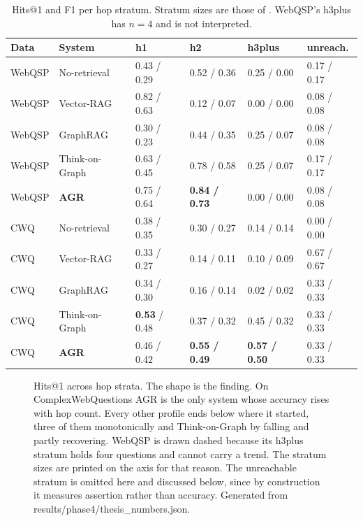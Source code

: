 \begin{table}[!tb]
  \begin{center}
    \caption[Hits@1 and F1 per hop stratum]{Hits@1 and F1 per hop stratum.
    Stratum sizes are those of . WebQSP's \textsf{h3plus} has
    $n = 4$ and is not interpreted.}
    \label{tab:strata}
    \small
    \begin{tabular}{|l|l|l|l|l|l|}
      \hline
      \textbf{Data} & \textbf{System} & \textbf{h1} & \textbf{h2} &
      \textbf{h3plus} & \textbf{unreach.} \\
      \hline
      WebQSP & No-retrieval   & 0.43 / 0.29 & 0.52 / 0.36 & 0.25 / 0.00 & 0.17 /
        0.17 \\
      WebQSP & Vector-RAG     & 0.82 / 0.63 & 0.12 / 0.07 & 0.00 / 0.00 & 0.08 /
        0.08 \\
      WebQSP & GraphRAG       & 0.30 / 0.23 & 0.44 / 0.35 & 0.25 / 0.07 & 0.08 /
        0.08 \\
      WebQSP & Think-on-Graph & 0.63 / 0.45 & 0.78 / 0.58 & 0.25 / 0.07 & 0.17 /
        0.17 \\
      WebQSP & \textbf{AGR}   & 0.75 / 0.64 & \textbf{0.84 / 0.73} & 0.00 / 0.00
        & 0.08 / 0.08 \\
      \hline
      CWQ & No-retrieval   & 0.38 / 0.35 & 0.30 / 0.27 & 0.14 / 0.14 & 0.00 /
        0.00 \\
      CWQ & Vector-RAG     & 0.33 / 0.27 & 0.14 / 0.11 & 0.10 / 0.09 & 0.67 /
        0.67 \\
      CWQ & GraphRAG       & 0.34 / 0.30 & 0.16 / 0.14 & 0.02 / 0.02 & 0.33 /
        0.33 \\
      CWQ & Think-on-Graph & \textbf{0.53} / 0.48 & 0.37 / 0.32 & 0.45 / 0.32 &
        0.33 / 0.33 \\
      CWQ & \textbf{AGR}   & 0.46 / 0.42 & \textbf{0.55 / 0.49} & \textbf{0.57 /
        0.50} & 0.33 / 0.33 \\
      \hline
    \end{tabular}
  \end{center}
\end{table}

\begin{figure}[!tb]
  \begin{center}
    
  \end{center}
  \caption[Hits@1 across hop strata]{Hits@1 across hop strata. The shape is the
  finding. On ComplexWebQuestions AGR is the only system whose accuracy rises
  with hop count. Every other profile ends below where it started, three of them
  monotonically and Think-on-Graph by falling and partly recovering. WebQSP is
  drawn dashed because its \textsf{h3plus} stratum holds four questions and
  cannot carry a trend. The stratum sizes are printed on the axis for that
  reason. The \textsf{unreachable} stratum is omitted here and discussed below,
  since by construction it measures assertion rather than accuracy. Generated
  from \textsf{results/phase4/thesis\_numbers.json}.}
  \label{fig:hop-strata}
\end{figure}


